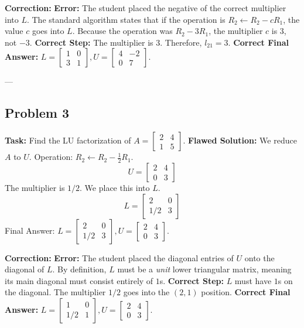 \documentclass[11pt]{article}
\begin{document}
\vspace{1cm}
\textbf{Correction:}
\textbf{Error:} The student placed the negative of the correct multiplier into $L$. The standard algorithm states that if the operation is $R_2 \leftarrow R_2 - cR_1$, the value $c$ goes into $L$. Because the operation was $R_2 - 3R_1$, the multiplier $c$ is $3$, not $-3$.
\textbf{Correct Step:}
The multiplier is $3$. Therefore, $l_{21} = 3$.
\textbf{Correct Final Answer:} $L = \begin{bmatrix} 1 & 0 \\ 3 & 1 \end{bmatrix}, U = \begin{bmatrix} 4 & -2 \\ 0 & 7 \end{bmatrix}$.

---

\subsection{Problem 3}
\textbf{Task:} Find the LU factorization of $A = \begin{bmatrix} 2 & 4 \\ 1 & 5 \end{bmatrix}$.
\textbf{Flawed Solution:}
We reduce $A$ to $U$.
Operation: $R_2 \leftarrow R_2 - \frac{1}{2}R_1$.
\[ U = \begin{bmatrix} 2 & 4 \\ 0 & 3 \end{bmatrix} \]
The multiplier is $1/2$. We place this into $L$.
\[ L = \begin{bmatrix} 2 & 0 \\ 1/2 & 3 \end{bmatrix} \]
Final Answer: $L = \begin{bmatrix} 2 & 0 \\ 1/2 & 3 \end{bmatrix}, U = \begin{bmatrix} 2 & 4 \\ 0 & 3 \end{bmatrix}$.

\vspace{1cm}
\textbf{Correction:}
\textbf{Error:} The student placed the diagonal entries of $U$ onto the diagonal of $L$. By definition, $L$ must be a \textit{unit} lower triangular matrix, meaning its main diagonal must consist entirely of $1$s.
\textbf{Correct Step:}
$L$ must have $1$s on the diagonal. The multiplier $1/2$ goes into the $(2,1)$ position.
\textbf{Correct Final Answer:} $L = \begin{bmatrix} 1 & 0 \\ 1/2 & 1 \end{bmatrix}, U = \begin{bmatrix} 2 & 4 \\ 0 & 3 \end{bmatrix}$.
\end{document}

